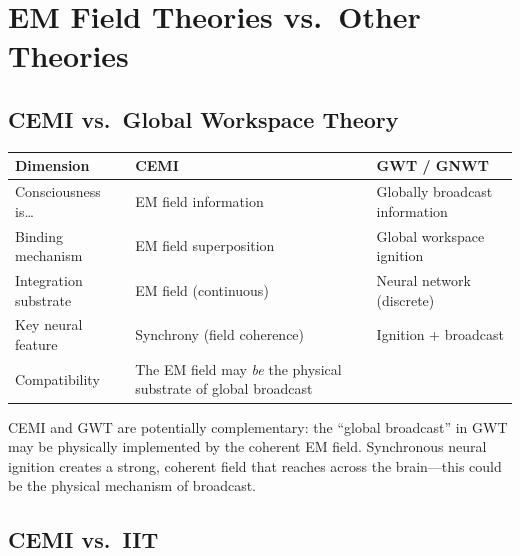 \documentclass[11pt,a4paper]{report}
\begin{document}
\chapter{EM Field Theories vs.\ Other Theories}

\section{CEMI vs.\ Global Workspace Theory}

\begin{compbox}
\renewcommand{\arraystretch}{1.4}
\begin{tabular}{>{\raggedright}p{3cm} >{\raggedright}p{5.2cm} >{\raggedright\arraybackslash}p{4.8cm}}
  \toprule
  \textbf{Dimension} & \textbf{CEMI} & \textbf{GWT / GNWT} \\
  \midrule
  Consciousness is\ldots & EM field information & Globally broadcast information \\
  Binding mechanism & EM field superposition & Global workspace ignition \\
  Integration substrate & EM field (continuous) & Neural network (discrete) \\
  Key neural feature & Synchrony (field coherence) & Ignition + broadcast \\
  Compatibility & The EM field may \emph{be} the physical substrate of global broadcast \\
  \bottomrule
\end{tabular}
\end{compbox}

CEMI and GWT are potentially complementary: the ``global broadcast'' in GWT may be physically implemented by the coherent EM field. Synchronous neural ignition creates a strong, coherent field that reaches across the brain---this could be the physical mechanism of broadcast.

\section{CEMI vs.\ IIT}
\end{document}
